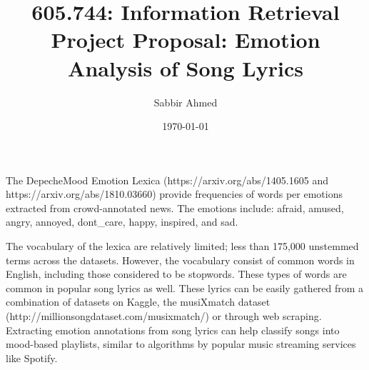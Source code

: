 \documentclass[11pt]{article}
\title{605.744: Information Retrieval \\ Project Proposal: Emotion Analysis of Song Lyrics}
\author{Sabbir Ahmed}
\date{\today}
\begin{document}
\maketitle

    The DepecheMood Emotion Lexica (https://arxiv.org/abs/1405.1605 and https://arxiv.org/abs/1810.03660) provide frequencies of words per emotions extracted from crowd-annotated news. The emotions include: afraid, amused, angry, annoyed, dont\_care, happy, inspired, and sad.

    The vocabulary of the lexica are relatively limited; less than 175,000 unstemmed terms across the datasets. However, the vocabulary consist of common words in English, including those considered to be stopwords. These types of words are common in popular song lyrics as well. These lyrics can be easily gathered from a combination of datasets on Kaggle, the musiXmatch dataset (http://millionsongdataset.com/musixmatch/) or through web scraping. Extracting emotion annotations from song lyrics can help classify songs into mood-based playlists, similar to algorithms by popular music streaming services like Spotify.
\end{document}
